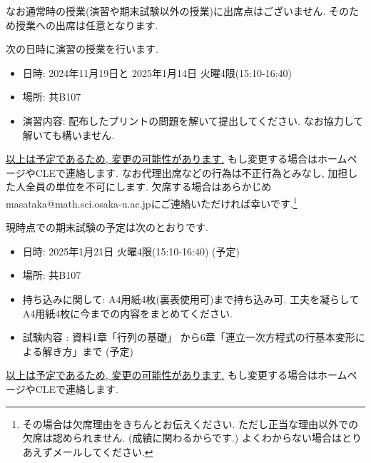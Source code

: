 \documentclass[dvipdfmx,a4paper,11pt]{article}
\theoremstyle{definition}
\begin{document}
なお通常時の授業(演習や期末試験以外の授業)に出席点はございません. そのため授業への出席は任意となります. 


\medskip
{}

次の日時に演習の授業を行います. 
\begin{itemize}
  \setlength{\parskip}{0cm} 
  \setlength{\itemsep}{0cm}
\item 日時: 2024年11月19日と 2025年1月14日 火曜4限(15:10-16:40)
\item 場所: 共B107
\item 演習内容: 配布したプリントの問題を解いて提出してください. なお協力して解いても構いません. 
\end{itemize}
\underline{以上は予定であるため, 変更の可能性があります.} もし変更する場合はホームページやCLEで連絡します. 
なお代理出席などの行為は不正行為とみなし, 加担した人全員の単位を不可にします.
欠席する場合はあらかじめmasataka@math.sci.osaka-u.ac.jpにご連絡いただければ幸いです.\footnote{その場合は欠席理由をきちんとお伝えください. ただし正当な理由以外での欠席は認められません. (成績に関わるからです.) よくわからない場合はとりあえずメールしてください. }

\newpage
{}

現時点での期末試験の予定は次のとおりです. 
\begin{itemize}
  \setlength{\parskip}{0cm} 
  \setlength{\itemsep}{0cm}
\item 日時: 2025年1月21日 火曜4限(15:10-16:40) (予定)
\item 場所: 共B107
\item 持ち込みに関して: A4用紙4枚(裏表使用可)まで持ち込み可. 工夫を凝らしてA4用紙4枚に今までの内容をまとめてください.
\item 試験内容 : 資料1章「行列の基礎」 から6章「連立一次方程式の行基本変形による解き方」まで (予定)
\end{itemize}

\underline{以上は予定であるため, 変更の可能性があります.} もし変更する場合はホームページやCLEで連絡します. 
\end{document}

